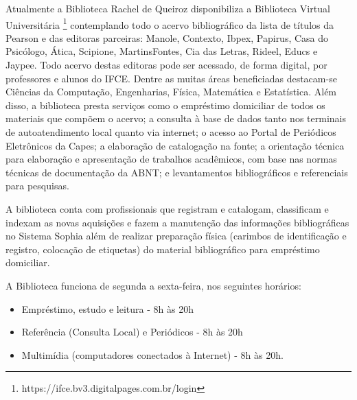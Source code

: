 Atualmente a Biblioteca Rachel de Queiroz disponibiliza a Biblioteca Virtual Universitária \footnote{https://ifce.bv3.digitalpages.com.br/login} contemplando todo o acervo bibliográfico da lista de títulos da Pearson e das editoras parceiras: Manole, Contexto, Ibpex, Papirus, Casa do Psicólogo, Ática, Scipione, MartinsFontes, Cia das Letras, Rideel, Educs e Jaypee. Todo acervo destas editoras pode ser acessado, de forma digital, por professores e alunos do IFCE. Dentre as muitas áreas beneficiadas destacam-se Ciências da Computação, Engenharias, Física, Matemática e Estatística. Além disso, a biblioteca presta serviços como o empréstimo domiciliar de todos os materiais que compõem o acervo; a consulta à base de dados tanto nos terminais de autoatendimento local quanto via internet; o acesso ao Portal de Periódicos Eletrônicos da Capes; a elaboração de catalogação na fonte; a orientação técnica para elaboração e apresentação de trabalhos acadêmicos, com base nas normas técnicas de documentação da ABNT; e levantamentos bibliográficos e referenciais para pesquisas.

A biblioteca conta com profissionais que registram e catalogam, classificam e indexam as novas aquisições e fazem a manutenção das informações bibliográficas no Sistema Sophia além de realizar preparação física (carimbos de identificação e registro, colocação de etiquetas) do material bibliográfico para empréstimo domiciliar.

A Biblioteca funciona de segunda a sexta-feira, nos seguintes horários:

\begin{itemize}
	\item Empréstimo, estudo e leitura - 8h às 20h
	\item Referência (Consulta Local) e Periódicos - 8h às 20h
	\item Multimídia (computadores conectados à Internet) - 8h às 20h.
\end{itemize}

